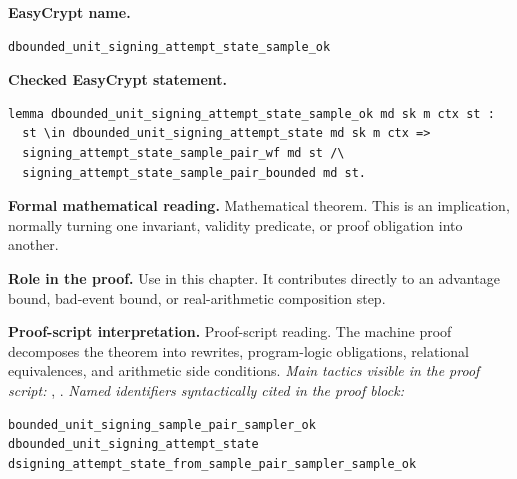 \begin{formaltheorem}
\noindent\textbf{EasyCrypt name.}
\begin{lstlisting}[language=EasyCrypt,basicstyle=\ttfamily\scriptsize]
dbounded_unit_signing_attempt_state_sample_ok
\end{lstlisting}
\noindent\textbf{Checked EasyCrypt statement.}
\begin{lstlisting}[language=EasyCrypt,basicstyle=\ttfamily\scriptsize]
lemma dbounded_unit_signing_attempt_state_sample_ok md sk m ctx st :
  st \in dbounded_unit_signing_attempt_state md sk m ctx =>
  signing_attempt_state_sample_pair_wf md st /\
  signing_attempt_state_sample_pair_bounded md st.
\end{lstlisting}
\noindent\textbf{Formal mathematical reading.}
Mathematical theorem. This is an implication, normally turning one invariant, validity predicate, or proof obligation into another.

\noindent\textbf{Role in the proof.}
Use in this chapter. It contributes directly to an advantage bound, bad-event bound, or real-arithmetic composition step.

\noindent\textbf{Proof-script interpretation.}
Proof-script reading. The machine proof decomposes the theorem into rewrites, program-logic obligations, relational equivalences, and arithmetic side conditions.
\emph{Main tactics visible in the proof script:} \ec{rewrite}, \ec{apply}.
\emph{Named identifiers syntactically cited in the proof block:}
\begin{lstlisting}[language=EasyCrypt,basicstyle=\ttfamily\scriptsize]
bounded_unit_signing_sample_pair_sampler_ok
dbounded_unit_signing_attempt_state
dsigning_attempt_state_from_sample_pair_sampler_sample_ok
\end{lstlisting}

\end{formaltheorem}

